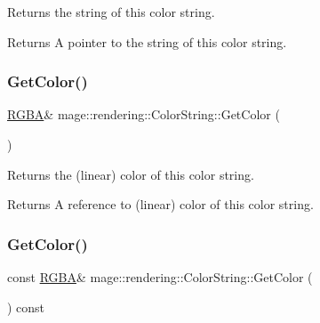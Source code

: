 Returns the string of this color string.

\begin{DoxyReturn}{Returns}
A pointer to the string of this color string. 
\end{DoxyReturn}
\hypertarget{classmage_1_1rendering_1_1_color_string_a396ed7da3f3b27068b05c1ead9816046}{}\label{classmage_1_1rendering_1_1_color_string_a396ed7da3f3b27068b05c1ead9816046} 
\subsubsection{\texorpdfstring{Get\+Color()}{GetColor()}\hspace{0.1cm}{\footnotesize\ttfamily [1/2]}}
{\footnotesize\ttfamily \hyperlink{structmage_1_1_r_g_b_a}{R\+G\+BA}\& mage\+::rendering\+::\+Color\+String\+::\+Get\+Color (\begin{DoxyParamCaption}{ }\end{DoxyParamCaption})\hspace{0.3cm}{\ttfamily [noexcept]}}

Returns the (linear) color of this color string.

\begin{DoxyReturn}{Returns}
A reference to (linear) color of this color string. 
\end{DoxyReturn}
\hypertarget{classmage_1_1rendering_1_1_color_string_a08bd67511180f15e902ce34dd402fe82}{}\label{classmage_1_1rendering_1_1_color_string_a08bd67511180f15e902ce34dd402fe82} 
\subsubsection{\texorpdfstring{Get\+Color()}{GetColor()}\hspace{0.1cm}{\footnotesize\ttfamily [2/2]}}
{\footnotesize\ttfamily const \hyperlink{structmage_1_1_r_g_b_a}{R\+G\+BA}\& mage\+::rendering\+::\+Color\+String\+::\+Get\+Color (\begin{DoxyParamCaption}{ }\end{DoxyParamCaption}) const\hspace{0.3cm}{\ttfamily [noexcept]}}

